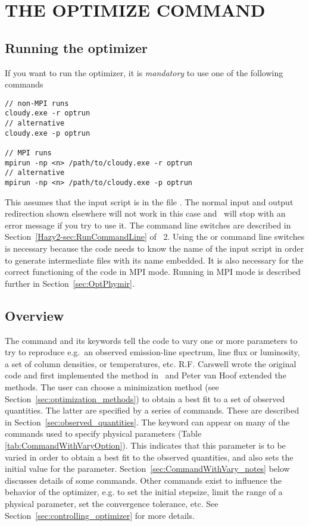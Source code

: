 \chapter{THE OPTIMIZE COMMAND}
\label{sec:CommandOptimize}

\section{Running the optimizer}

If you want to run the optimizer, it is {\em mandatory} to use one of the
following commands
\begin{verbatim}
// non-MPI runs
cloudy.exe -r optrun
// alternative
cloudy.exe -p optrun

// MPI runs
mpirun -np <n> /path/to/cloudy.exe -r optrun
// alternative
mpirun -np <n> /path/to/cloudy.exe -p optrun
\end{verbatim}
This assumes that the input script is in the file . The
normal input and output redirection shown elsewhere will not work in this case
and \Cloudy\ will stop with an error message if you try to use it. The command
line switches are described in Section~\ref{Hazy2-sec:RunCommandLine} of
\Hazy~2. Using the  or  command line switches is
necessary because the code needs to know the name of the input script in order
to generate intermediate files with its name embedded. It is also necessary
for the correct functioning of the code in MPI mode. Running in MPI mode is
described further in Section~\ref{sec:OptPhymir}.

\section{Overview}

The  command and its keywords
tell the code to vary one or more
parameters to try to reproduce e.g.\ an observed emission-line spectrum,
line
flux or luminosity, a set of column densities, or temperatures, etc.
R.F. Carswell wrote the original code and first implemented
the method in \Cloudy\ 
and Peter van Hoof extended the methods.
The user can choose a minimization method (see Section~\ref{sec:optimization_methods}) to obtain a best fit
to a set of
observed quantities.
The latter
are specified by a series
of  commands.
These are described in Section~\ref{sec:observed_quantities}.
The keyword  can appear on many of the commands
used to specify physical parameters
(Table \ref{tab:CommandWithVaryOption}). This indicates
that this parameter is to be varied in order to obtain a best fit to the observed quantities,
and also sets the initial value for the parameter.
Section~\ref{sec:CommandWithVary_notes}
below discusses details of some commands.
Other commands exist to influence the behavior of the optimizer, e.g. to
set the initial stepsize, limit the range of a physical parameter,
set the convergence tolerance, etc. See Section~\ref{sec:controlling_optimizer} for more details.

